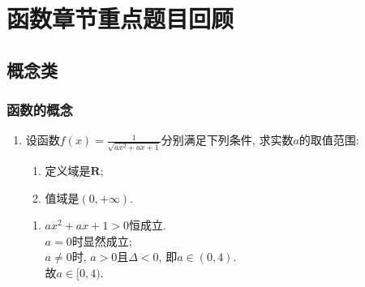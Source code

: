 \chapter*{函数章节重点题目回顾} %

\section*{概念类}
\subsection*{函数的概念}
\begin{enumerate}
    \item 设函数$f(x)=\frac{1}{\sqrt{ax^2+ax+1}}$分别满足下列条件, 求实数$a$的取值范围: 
\begin{enumerate}
\item 定义域是$\mathbf{R}$; 
\item 值域是$(0,+\infty)$. 
\end{enumerate}
\begin{jieda}
\begin{enumerate}
    \item $ax^2+ax+1>0$恒成立. \\
    $a=0$时显然成立; \\
    $a\neq 0$时, $a>0$且$ \Delta<0$, 即$a\in(0,4)$. \\
    故$a\in[0,4)$. 
    

\end{enumerate}
\end{jieda}
\end{enumerate}
